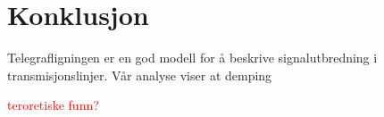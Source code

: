 \section{Konklusjon}
Telegrafligningen er en god modell for å beskrive signalutbredning i transmisjonslinjer. Vår analyse viser at demping 


\textcolor{red}{teroretiske funn?}